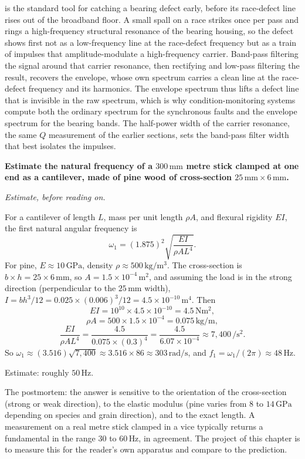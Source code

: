  is the standard tool for catching a
bearing defect early, before its race-defect line rises out of the
broadband floor. A small spall on a race strikes once per pass and rings
a high-frequency structural resonance of the bearing housing, so the
defect shows first not as a low-frequency line at the race-defect
frequency but as a train of impulses that amplitude-modulate a
high-frequency carrier. Band-pass filtering the signal around that
carrier resonance, then rectifying and low-pass filtering the result,
recovers the envelope, whose own spectrum carries a clean line at the
race-defect frequency and its harmonics. The envelope spectrum thus
lifts a defect line that is invisible in the raw spectrum, which is why
condition-monitoring systems compute both the ordinary spectrum for the
synchronous faults and the envelope spectrum for the bearing bands. The
half-power width of the carrier resonance, the same $Q$ measurement of
the earlier sections, sets the band-pass filter width that best isolates
the impulses.

\begin{estimation}
\textbf{Estimate the natural frequency of a $300\,\si{\milli\meter}$
metre stick clamped at one end as a cantilever, made of pine wood
of cross-section $25\,\si{\milli\meter} \times 6\,\si{\milli\meter}$.}

\smallskip
\textit{Estimate, before reading on.}

\smallskip
For a cantilever of length $L$, mass per unit length $\rho A$, and
flexural rigidity $EI$, the first natural angular frequency is
\[
\omega_1 = (1.875)^2 \sqrt{\frac{EI}{\rho A L^4}}.
\]
For pine, $E \approx 10\,\text{GPa}$, density $\rho \approx 500\,\si{
\kilogram\per\meter\cubed}$. The cross-section is $b \times h = 25
\times 6\,\si{\milli\meter}$, so $A = 1.5 \times 10^{-4}\,\si{\meter
\squared}$, and assuming the load is in the strong direction
(perpendicular to the $25\,\si{\milli\meter}$ width), $I = bh^3/12 =
0.025 \times (0.006)^3/12 = 4.5 \times 10^{-10}\,\si{\meter\tothe{4}}$.
Then
\[
EI = 10^{10} \times 4.5 \times 10^{-10} = 4.5\,\si{\newton\meter\squared},
\]
\[
\rho A = 500 \times 1.5 \times 10^{-4} = 0.075\,\si{\kilogram\per\meter},
\]
\[
\frac{EI}{\rho A L^4} = \frac{4.5}{0.075 \times (0.3)^4} = \frac{4.5}{
6.07 \times 10^{-4}} \approx 7{,}400\,\si{\per\second\squared}.
\]
So $\omega_1 \approx (3.516) \sqrt{7{,}400} \approx 3.516 \times 86
\approx 303\,\si{\radian\per\second}$, and $f_1 = \omega_1/(2\pi)
\approx 48\,\si{\hertz}$.

Estimate: roughly $50\,\si{\hertz}$.

The postmortem: the answer is sensitive to the orientation of the
cross-section (strong or weak direction), to the elastic modulus
(pine varies from $8$ to $14\,\text{GPa}$ depending on species and
grain direction), and to the exact length. A measurement on a real
metre stick clamped in a vice typically returns a fundamental in
the range $30$ to $60\,\si{\hertz}$, in agreement. The project of
this chapter is to measure this for the reader's own apparatus and
compare to the prediction.
\end{estimation}

